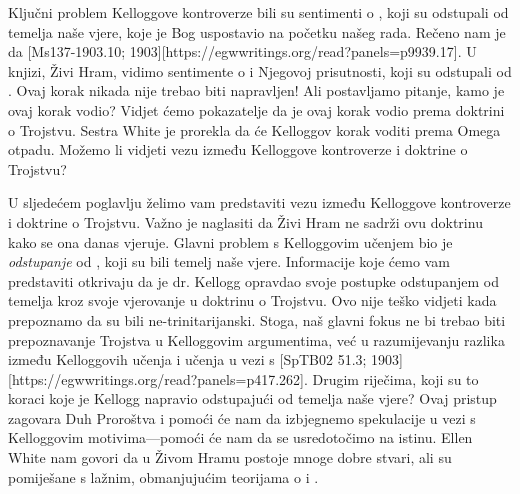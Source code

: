 
Ključni problem Kelloggove kontroverze bili su sentimenti o , koji su odstupali od temelja naše vjere, koje je Bog uspostavio na početku našeg rada. Rečeno nam je da [Ms137-1903.10; 1903][https://egwwritings.org/read?panels=p9939.17]. U knjizi, Živi Hram, vidimo sentimente o  i Njegovoj prisutnosti, koji su odstupali od . Ovaj korak nikada nije trebao biti napravljen! Ali postavljamo pitanje, kamo je ovaj korak vodio? Vidjet ćemo pokazatelje da je ovaj korak vodio prema doktrini o Trojstvu. Sestra White je prorekla da će Kelloggov korak voditi prema Omega otpadu. Možemo li vidjeti vezu između Kelloggove kontroverze i doktrine o Trojstvu?

U sljedećem poglavlju želimo vam predstaviti vezu između Kelloggove kontroverze i doktrine o Trojstvu. Važno je naglasiti da Živi Hram ne sadrži ovu doktrinu kako se ona danas vjeruje. Glavni problem s Kelloggovim učenjem bio je \textit{odstupanje} od , koji su bili temelj naše vjere. Informacije koje ćemo vam predstaviti otkrivaju da je dr. Kellogg opravdao svoje postupke odstupanjem od temelja kroz svoje vjerovanje u doktrinu o Trojstvu. Ovo nije teško vidjeti kada prepoznamo da su  bili ne-trinitarijanski. Stoga, naš glavni fokus ne bi trebao biti prepoznavanje Trojstva u Kelloggovim argumentima, već u razumijevanju razlika između Kelloggovih učenja i učenja  u vezi s [SpTB02 51.3; 1903][https://egwwritings.org/read?panels=p417.262]. Drugim riječima, koji su to koraci koje je Kellogg napravio odstupajući od temelja naše vjere? Ovaj pristup zagovara Duh Proroštva i pomoći će nam da izbjegnemo spekulacije u vezi s Kelloggovim motivima—pomoći će nam da se usredotočimo na istinu. Ellen White nam govori da u Živom Hramu postoje mnoge dobre stvari, ali su pomiješane s lažnim, obmanjujućim teorijama o  i .

